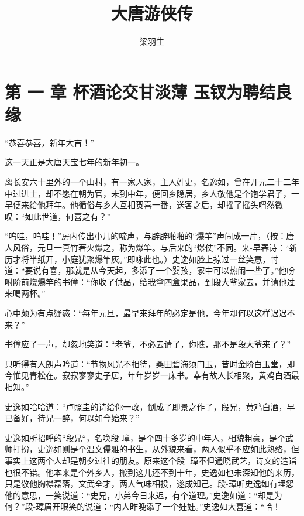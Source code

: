\documentclass[12pt,oneside]{book}
\title{大唐游侠传}
\author{梁羽生}
\begin{document}

\frontmatter


\setcounter{tocdepth}{2}    
\tableofcontents

\mainmatter

\chapter{第 一 章 杯酒论交甘淡薄
玉钗为聘结良缘}\label{ux7b2c-ux4e00-ux7ae0-ux676fux9152ux8bbaux4ea4ux7518ux6de1ux8584-ux7389ux9497ux4e3aux8058ux7ed3ux826fux7f18}

``恭喜恭喜，新年大吉！''

这一天正是大唐天宝七年的新年初一。

离长安六十里外的一个山村，有一家人家，主人姓史，名逸如，曾在开元二十二年中过进士，却不愿在朝为官，未到中年，便回乡隐居，乡人敬他是个饱学君子，一早便来给他拜年。他循俗与乡人互相贺喜一番，送客之后，却摇了摇头喟然微叹：``如此世道，何喜之有？''

``呜哇，呜哇！''房内传出小儿的啼声，与辟辟啪啪的``爆竿''声闹成一片，（按：唐人风俗，元旦一真竹著火爆之，称为爆竿。与后来的``爆仗''不同。来-早春诗：``新历才将半纸开，小庭犹聚爆竿灰。''即咏此也。）史逸如脸上掠过一丝笑意，忖道：``要说有喜，那就是从今天起，多添了一个婴孩，家中可以热闹一些了。''他吩咐阶前烧爆竿的书僮：``你收了供品，给我拿四盒果品，到段大爷家去，并请他过来喝两杯。''

心中颇为有点疑惑：``每年元旦，最早来拜年的必定是他，今年却何以这样迟迟不来？''

书僮应了一声，却忽地笑道：``老爷，不必去请了，你瞧，那不是段大爷来了？''

只听得有人朗声吟道：``节物风光不相待，桑田碧海须门玉，昔时金阶白玉堂，即今惟见青松在。寂寂寥寥史子居，年年岁岁一床书。幸有故人长相聚，黄鸡白酒最相知。''

史逸如哈哈道：``卢照圭的诗给你一改，倒成了即景之作了，段兄，黄鸡白酒，早已备好，待兄一醉，何以如今始来？''

史逸如所招呼的``段兄``，名唤段-璋，是个四十多岁的中年人，相貌粗豪，是个武师打扮，史逸如则是个温文儒雅的书生，从外貌来看，两人似乎不应如此熟络，但事实上这两个人却是朝夕过往的朋友。原来这个段-
璋不但通晓武艺，诗文的造诣也很不错。他本来是个外乡人，搬到这儿还不到十年，史逸如也未深知他的来历，只是敬他胸襟磊落，文武全才，两人气味相投，遂成知己。段-璋听史逸如有埋怨他的意思，一笑说道：``史兄，小弟今日来迟，有个道理。''史逸如道：``却是为何？''段-璋眉开眼笑的说道：``内人昨晚添了一个娃娃。''史逸如大喜道：``哈！
\end{document}
